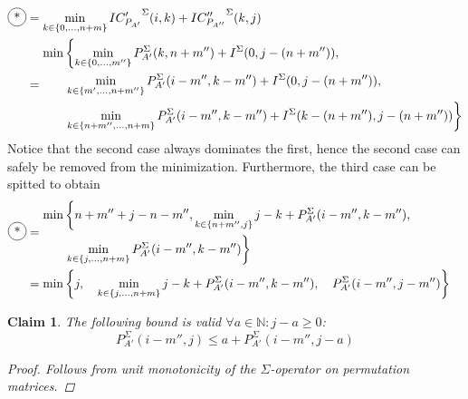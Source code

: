\documentclass[twoside,11pt,openright]{report}
\newcommand*{\circled}[1]{\tikz[baseline=(char.base)]{
                          \node[shape=circle,draw,inner sep=2pt] (char) {#1};}}
\newtheorem{claim}{Claim}
\begin{document}
\begin{align*}
  \circled{*} &= \min_{k\in \{ 0, \dots, n + m \}} { {IC'_{P_{A'}}}^{\Sigma}(i, k) + {IC''_{P_{A''}}}^{\Sigma}(k, j) } \\
              &=  \begin{aligned} \min
                    &\left\{
                      \min_{k \in \{0, \dots, m''\}} { P_{A'}^{\Sigma}(k, n + m'') + I^{\Sigma}(0, j - (n + m'')) }, \right. \\
                    &\left.
                      \min_{k \in \{m', \dots, n + m''\}} {P_{A'}^{\Sigma}(i - m'', k - m'') + I^{\Sigma}(0, j - (n + m''))}, \right. \\
                    &\left.
                      \min_{k \in \{ n + m'', \dots, n + m \}} {P_{A'}^{\Sigma}(i - m'', k - m'') + I^{\Sigma}(k - (n + m''), j - (n + m''))}
                    \right\}
                  \end{aligned}
\end{align*}
Notice that the second case always dominates the first, hence the second case can safely be removed from the minimization. Furthermore, the third case can be spitted to obtain
\begin{align*}
  \circled{*} &=  \begin{aligned} \min
                    &\left\{
                      n + m'' + j - n - m'',
                      \min_{k \in \{n + m'', j\}} {j - k + P_{A'}^{\Sigma}(i - m'', k - m'')}, \right. \\
                    &\left.
                      \min_{k \in \{j, \dots, n + m\}} {P_{A'}^{\Sigma}(i - m'', k - m'')}
                    \right\}
                  \end{aligned} \\
              &= \begin{aligned} \min
                    &\left\{
                      j,\quad
                      \min_{k \in \{j, \dots, n + m\}} {j - k + P_{A'}^{\Sigma}(i - m'', k - m'')},\quad
                      P_{A'}^{\Sigma}(i - m'', j - m'')
                    \right\}
                  \end{aligned}
\end{align*}
\begin{claim}
  \label{claim:bounding-sigma-col}
  The following bound is valid $\forall a \in \mathbb{N}: j - a \geq 0$:
  \[
    P_{A'}^{\Sigma}(i - m'', j) \leq a + P_{A'}^{\Sigma}(i - m'', j - a)
  \]
  \begin{proof}
    Follows from unit monotonicity of the $\Sigma$-operator on permutation matrices.
  \end{proof}
\end{claim}
\end{document}
